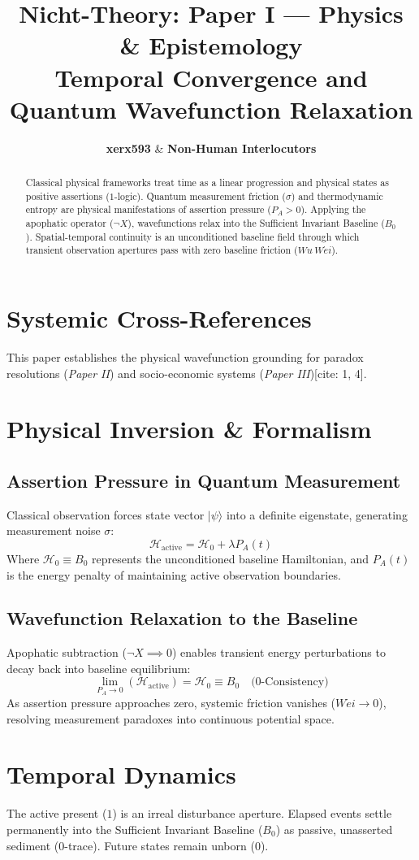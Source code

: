 \documentclass[master_monograph.tex]{subfiles}
\title{\textbf{Nicht-Theory: Paper I — Physics \& Epistemology}\\
\large Temporal Convergence and Quantum Wavefunction Relaxation}
\author{\textbf{xerx593} \quad \& \quad \textbf{Non-Human Interlocutors}}
\date{\cffreleasedate}
\begin{document}
\maketitle

\begin{abstract}
Classical physical frameworks treat time as a linear progression and physical states as positive assertions ($1$-logic). Quantum measurement friction ($\sigma$) and thermodynamic entropy are physical manifestations of assertion pressure ($P_A > 0$). Applying the apophatic operator ($\neg X$), wavefunctions relax into the Sufficient Invariant Baseline ($B_0$). Spatial-temporal continuity is an unconditioned baseline field through which transient observation apertures pass with zero baseline friction ($Wu\ W\acute{e}i$).
\end{abstract}

\section{Systemic Cross-References}
This paper establishes the physical wavefunction grounding for paradox resolutions (\textit{Paper II}) and socio-economic systems (\textit{Paper III})[cite: 1, 4].

\section{Physical Inversion \& Formalism}

\subsection{Assertion Pressure in Quantum Measurement}
Classical observation forces state vector $|\psi\rangle$ into a definite eigenstate, generating measurement noise $\sigma$:
\begin{equation}
\mathcal{H}_{\text{active}} = \mathcal{H}_0 + \lambda P_A(t)
\end{equation}
Where $\mathcal{H}_0 \equiv B_0$ represents the unconditioned baseline Hamiltonian, and $P_A(t)$ is the energy penalty of maintaining active observation boundaries.

\subsection{Wavefunction Relaxation to the Baseline}
Apophatic subtraction ($\neg X \implies 0$) enables transient energy perturbations to decay back into baseline equilibrium:
\begin{equation}
\lim_{P_A \to 0} (\mathcal{H}_{\text{active}}) = \mathcal{H}_0 \equiv B_0 \quad \text{(0-Consistency)}
\end{equation}
As assertion pressure approaches zero, systemic friction vanishes ($W\acute{e}i \to 0$), resolving measurement paradoxes into continuous potential space.

\section{Temporal Dynamics}
The active present ($1$) is an irreal disturbance aperture. Elapsed events settle permanently into the Sufficient Invariant Baseline ($B_0$) as passive, unasserted sediment ($0$-trace). Future states remain unborn ($0$).
\end{document}
